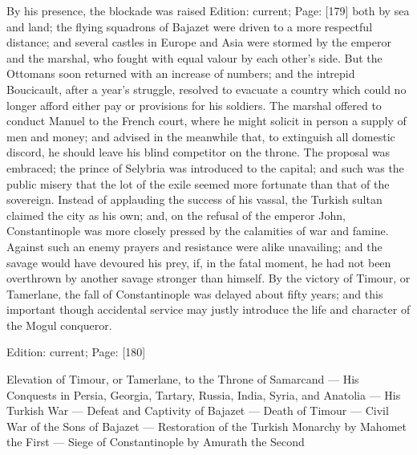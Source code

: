 By his presence, the blockade was raised Edition: current; Page: [179] both by sea and land; the flying squadrons of Bajazet were driven to a more respectful distance; and several castles in Europe and Asia were stormed by the emperor and the marshal, who fought with equal valour by each other\texthebrew{}’s side. But the Ottomans soon returned with an increase of numbers; and the intrepid Boucicault, after a year\texthebrew{}’s struggle, resolved to evacuate a country which could no longer afford either pay or provisions for his soldiers. The marshal offered to conduct Manuel to the French court, where he might solicit in person a supply of men and money; and advised in the meanwhile that, to extinguish all domestic discord, he should leave his blind competitor on the throne. The proposal was embraced; the prince of Selybria was introduced to the capital; and such was the public misery that the lot of the exile seemed more fortunate than that of the sovereign. Instead of applauding the success of his vassal, the Turkish sultan claimed the city as his own; and, on the refusal of the emperor John, Constantinople was more closely pressed by the calamities of war and famine. Against such an enemy prayers and resistance were alike unavailing; and the savage would have devoured his prey, if, in the fatal moment, he had not been overthrown by another savage stronger than himself. By the victory of Timour, or Tamerlane, the fall of Constantinople was delayed about fifty years; and this important though accidental service may justly introduce the life and character of the Mogul conqueror.

Edition: current; Page: [180]


Elevation of Timour, or Tamerlane, to the Throne of Samarcand \texthebrew{—} His Conquests in Persia, Georgia, Tartary, Russia, India, Syria, and Anatolia \texthebrew{—} His Turkish War \texthebrew{—} Defeat and Captivity of Bajazet \texthebrew{—} Death of Timour \texthebrew{—} Civil War of the Sons of Bajazet \texthebrew{—} Restoration of the Turkish Monarchy by Mahomet the First \texthebrew{—} Siege of Constantinople by Amurath the Second

